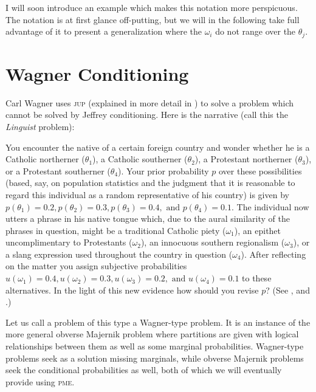 \documentclass[11pt]{article}
\begin{document}
I will soon introduce an example which makes this notation more
perspicuous. The notation is at first glance off-putting, but we will
in the following take full advantage of it to present a generalization
where the $\omega_{i}$ do not range over the $\theta_{j}$.

\section{Wagner Conditioning}
\label{wc}

Carl Wagner uses \textsc{jup} (explained in more detail in
) to solve a problem which cannot be solved by
Jeffrey conditioning. Here is the narrative (call this the
\emph{Linguist} problem):

\begin{quotex}
  You encounter the native of a certain foreign country and wonder
  whether he is a Catholic northerner ($\theta_{1}$), a Catholic
  southerner ($\theta_{2}$), a Protestant northerner ($\theta_{3}$),
  or a Protestant southerner ($\theta_{4}$). Your prior probability
  $p$ over these possibilities (based, say, on population statistics
  and the judgment that it is reasonable to regard this individual as
  a random representative of his country) is given by
  $p(\theta_{1})=0.2,p(\theta_{2})=0.3,p(\theta_{3})=0.4,\mbox{ and
  }p(\theta_{4})=0.1$. The individual now utters a phrase in his
  native tongue which, due to the aural similarity of the phrases in
  question, might be a traditional Catholic piety ($\omega_{1}$), an
  epithet uncomplimentary to Protestants ($\omega_{2}$), an innocuous
  southern regionalism ($\omega_{3}$), or a slang expression used
  throughout the country in question ($\omega_{4}$). After reflecting
  on the matter you assign subjective probabilities
  $u(\omega_{1})=0.4,u(\omega_{2})=0.3,u(\omega_{3})=0.2,\mbox{ and
  }u(\omega_{4})=0.1$ to these alternatives. In the light of this new
  evidence how should you revise $p$? (See ,
  and .)
\end{quotex}

Let us call a problem of this type a Wagner-type problem. It is an
instance of the more general obverse Majernik problem where partitions
are given with logical relationships between them as well as some
marginal probabilities. Wagner-type problems seek as a solution
missing marginals, while obverse Majernik problems seek the
conditional probabilities as well, both of which we will eventually
provide using \textsc{pme}.
\end{document}
